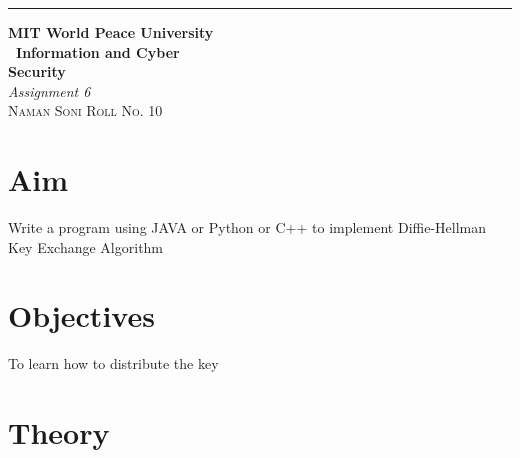 \documentclass{article}
\begin{document}
	\begin{titlepage} %
	
	\raggedleft\rule{1pt}{\textheight} %
	\hspace{0.05\textwidth} %
	\parbox[b]{0.75\textwidth}
	{ %
		
		{\Huge\bfseries MIT World Peace University \\[0.5\baselineskip] \ Information and Cyber \\ Security}\\[2\baselineskip] %
		{\large\textit{Assignment 6}}\\[4\baselineskip] %
		{\Large\textsc{Naman Soni Roll No. 10}} %
		
		\vspace{0.5\textheight} %
	}
	
\end{titlepage}
\tableofcontents
\pagebreak
\section{\textbf{Aim}}
Write a program using JAVA or Python or C++ to implement Diffie-Hellman Key Exchange Algorithm
\section{\textbf{Objectives}}
To learn how to distribute the key
\section{\textbf{Theory}}
\end{document}
